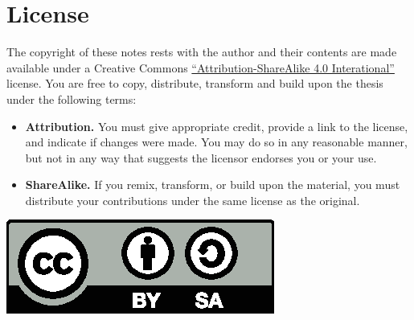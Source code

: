 \chapter*{License}%
\label{cha:license}

The copyright of these notes rests with the author and
their contents are made available under a Creative Commons
\href{https://creativecommons.org/licenses/by-sa/4.0/}{``Attribution-ShareAlike 4.0 Interational''}
license.
You are free to copy, distribute, transform and build upon the thesis under the following terms:
\begin{itemize}
    \item \textbf{Attribution.}
    You must give appropriate credit, provide a link to the license, and indicate if changes were made.
    You may do so in any reasonable manner, but not in any way that suggests the licensor endorses you or your use.
    \item \textbf{ShareAlike.} If you remix, transform, or build upon the material,
        you must distribute your contributions under the same license as the original.
\end{itemize}

\vspace{1cm}
\hfill \includegraphics[scale=.7]{figures/cc-by-sa.eps}
